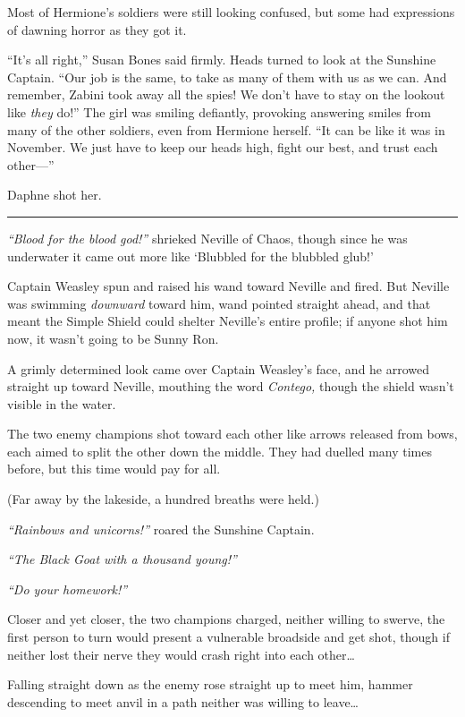 Most of Hermione's soldiers were still looking confused, but some had
expressions of dawning horror as they got it.

``It's all right,'' Susan Bones said firmly. Heads turned to look at the
Sunshine Captain. ``Our job is the same, to take as many of them with us
as we can. And remember, Zabini took away all the spies! We don't have
to stay on the lookout like \emph{they} do!'' The girl was smiling
defiantly, provoking answering smiles from many of the other soldiers,
even from Hermione herself. ``It can be like it was in November. We just
have to keep our heads high, fight our best, and trust each other---''

Daphne shot her.

\begin{center}\rule{3in}{0.4pt}\end{center}

\emph{``Blood for the blood god!''} shrieked Neville of Chaos, though
since he was underwater it came out more like `Blubbled for the blubbled
glub!'

Captain Weasley spun and raised his wand toward Neville and fired. But
Neville was swimming \emph{downward} toward him, wand pointed straight
ahead, and that meant the Simple Shield could shelter Neville's entire
profile; if anyone shot him now, it wasn't going to be Sunny Ron.

A grimly determined look came over Captain Weasley's face, and he
arrowed straight up toward Neville, mouthing the word \emph{Contego,}
though the shield wasn't visible in the water.

The two enemy champions shot toward each other like arrows released from
bows, each aimed to split the other down the middle. They had duelled
many times before, but this time would pay for all.

(Far away by the lakeside, a hundred breaths were held.)

\emph{``Rainbows and unicorns!''} roared the Sunshine Captain.

\emph{``The Black Goat with a thousand young!''}

\emph{``Do your homework!''}

Closer and yet closer, the two champions charged, neither willing to
swerve, the first person to turn would present a vulnerable broadside
and get shot, though if neither lost their nerve they would crash right
into each other\ldots{}

Falling straight down as the enemy rose straight up to meet him, hammer
descending to meet anvil in a path neither was willing to leave\ldots{}

